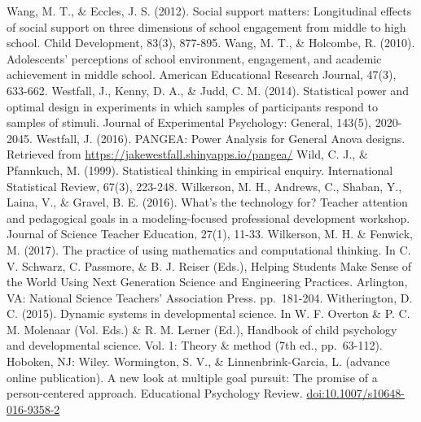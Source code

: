 \documentclass[]{book}
\theoremstyle{definition}
\theoremstyle{definition}
\theoremstyle{definition}
\theoremstyle{remark}
\begin{document}
Wang, M. T., \& Eccles, J. S. (2012). Social support matters:
Longitudinal effects of social support on three dimensions of school
engagement from middle to high school. Child Development, 83(3),
877-895. Wang, M. T., \& Holcombe, R. (2010). Adolescents' perceptions
of school environment, engagement, and academic achievement in middle
school. American Educational Research Journal, 47(3), 633-662. Westfall,
J., Kenny, D. A., \& Judd, C. M. (2014). Statistical power and optimal
design in experiments in which samples of participants respond to
samples of stimuli. Journal of Experimental Psychology: General, 143(5),
2020-2045. Westfall, J. (2016). PANGEA: Power Analysis for General Anova
designs. Retrieved from \url{https://jakewestfall.shinyapps.io/pangea/}
Wild, C. J., \& Pfannkuch, M. (1999). Statistical thinking in empirical
enquiry. International Statistical Review, 67(3), 223-248. Wilkerson, M.
H., Andrews, C., Shaban, Y., Laina, V., \& Gravel, B. E. (2016). What's
the technology for? Teacher attention and pedagogical goals in a
modeling-focused professional development workshop. Journal of Science
Teacher Education, 27(1), 11-33. Wilkerson, M. H. \& Fenwick, M. (2017).
The practice of using mathematics and computational thinking. In C. V.
Schwarz, C. Passmore, \& B. J. Reiser (Eds.), Helping Students Make
Sense of the World Using Next Generation Science and Engineering
Practices. Arlington, VA: National Science Teachers' Association Press.
pp.~181-204. Witherington, D. C. (2015). Dynamic systems in
developmental science. In W. F. Overton \& P. C. M. Molenaar (Vol. Eds.)
\& R. M. Lerner (Ed.), Handbook of child psychology and developmental
science. Vol. 1: Theory \& method (7th ed., pp.~63-112). Hoboken, NJ:
Wiley. Wormington, S. V., \& Linnenbrink-Garcia, L. (advance online
publication). A new look at multiple goal pursuit: The promise of a
person-centered approach. Educational Psychology Review.
\url{doi:10.1007/s10648-016-9358-2}


\end{document}
